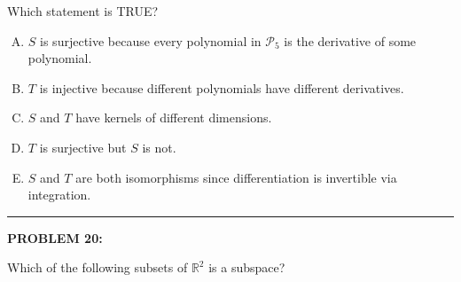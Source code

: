 \documentclass[12pt]{amsart}
\newcommand{\divider}{
  \vspace{-1em} %
  \noindent
  \raisebox{-0.15ex}{\textbullet}%
  \hspace{0.5em}%
  \rule[0.5ex]{0.95\textwidth}{1.0pt}%
  \hspace{0.5em}%
  \raisebox{-0.15ex}{\textbullet}%
  \vspace{0em} %
}
\begin{document}
Which statement is TRUE?

\begin{enumerate}[(A)]
\item $S$ is surjective because every polynomial in $\mathcal{P}_5$ is the derivative of some polynomial.
\item $T$ is injective because different polynomials have different derivatives.
\item $S$ and $T$ have kernels of different dimensions.
\item $T$ is surjective but $S$ is not.
\item $S$ and $T$ are both isomorphisms since differentiation is invertible via integration.
\end{enumerate}


\divider

{\bf PROBLEM 20:}

Which of the following subsets of $\mathbb{R}^2$ is a subspace?
\end{document}
